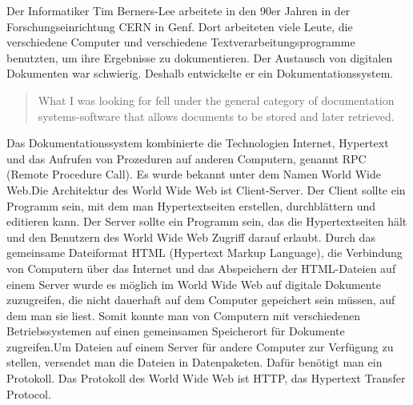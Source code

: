 \documentclass{llncs}
\begin{document}
Der Informatiker Tim Berners-Lee arbeitete in den 90er Jahren in der Forschungseinrichtung CERN in Genf. Dort arbeiteten viele Leute, die verschiedene Computer und verschiedene Textverarbeitungsprogramme benutzten, um ihre Ergebnisse zu dokumentieren. Der Austausch von digitalen Dokumenten war schwierig. Deshalb entwickelte er ein Dokumentationssystem. \begin{quote}What I was looking for fell under the general category of documentation systems-software that allows documents to be stored and later retrieved. \cite{Berners-Lee1999} \end{quote}
Das Dokumentationssystem kombinierte die Technologien Internet, Hypertext und das Aufrufen von Prozeduren auf anderen Computern, genannt RPC (Remote Procedure Call). Es wurde bekannt unter dem Namen World Wide Web.\newline Die Architektur des World Wide Web ist Client-Server. Der Client sollte ein Programm sein, mit dem man Hypertextseiten erstellen, durchblättern und editieren kann.\cite{Berners-Lee1999} Der Server sollte ein Programm sein, das die Hypertextseiten hält und den Benutzern des World Wide Web Zugriff darauf erlaubt.\cite{Berners-Lee1999} 
Durch das gemeinsame Dateiformat HTML (Hypertext Markup Language), die Verbindung von Computern über das Internet und das Abspeichern der HTML-Dateien auf einem Server wurde es möglich im World Wide Web auf digitale Dokumente zuzugreifen, die nicht dauerhaft auf dem Computer gepeichert sein müssen, auf dem man sie liest. Somit konnte man von Computern mit verschiedenen Betriebssystemen auf einen gemeinsamen Speicherort für Dokumente zugreifen.\newline Um Dateien auf einem Server für andere Computer zur Verfügung zu stellen, versendet man die Dateien in Datenpaketen. Dafür benötigt man ein Protokoll. Das Protokoll des World Wide Web ist HTTP, das Hypertext Transfer Protocol.
\end{document}
